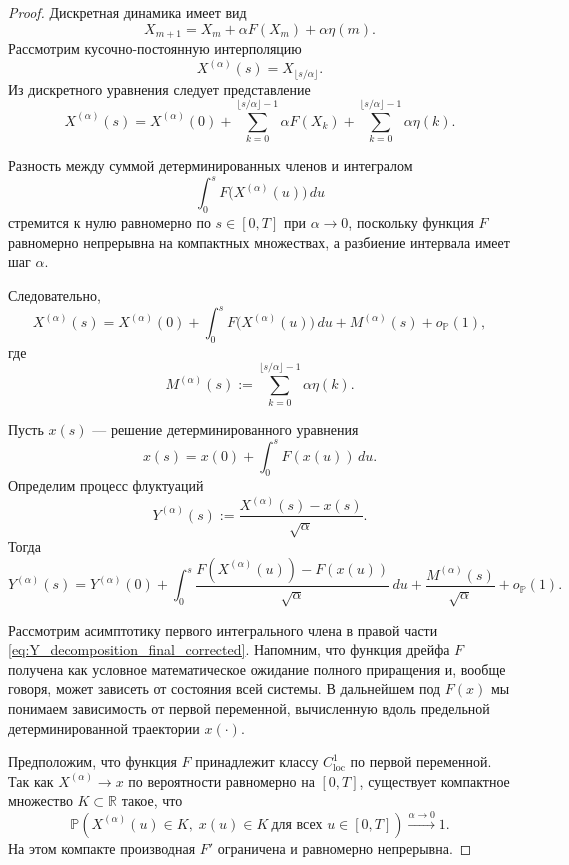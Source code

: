\documentclass[12pt,a4paper]{article}
\theoremstyle{definition}
\begin{document}
\begin{proof}
Дискретная динамика имеет вид
\[
X_{m+1}
=
X_m
+
\alpha F(X_m)
+
\alpha \eta(m).
\]
Рассмотрим кусочно-постоянную интерполяцию
\[
X^{(\alpha)}(s)
=
X_{\lfloor s/\alpha \rfloor}.
\]
Из дискретного уравнения следует представление
\begin{equation}
\label{eq:integral_representation_corrected}
X^{(\alpha)}(s)
=
X^{(\alpha)}(0)
+
\sum_{k=0}^{\lfloor s/\alpha \rfloor-1}
\alpha F(X_k)
+
\sum_{k=0}^{\lfloor s/\alpha \rfloor-1}
\alpha \eta(k).
\end{equation}

Разность между суммой детерминированных членов
и интегралом
\[
\int_0^s F\bigl(X^{(\alpha)}(u)\bigr)\,du
\]
стремится к нулю равномерно по $s\in[0,T]$
при $\alpha\to0$,
поскольку функция $F$ равномерно непрерывна
на компактных множествах,
а разбиение интервала имеет шаг $\alpha$.

Следовательно,
\[
X^{(\alpha)}(s)
=
X^{(\alpha)}(0)
+
\int_0^s F\bigl(X^{(\alpha)}(u)\bigr)\,du
+
M^{(\alpha)}(s)
+
o_{\mathbb P}(1),
\]
где
\[
M^{(\alpha)}(s)
:=
\sum_{k=0}^{\lfloor s/\alpha \rfloor-1}
\alpha \eta(k).
\]

Пусть $x(s)$ — решение детерминированного уравнения
\[
x(s)
=
x(0)
+
\int_0^s F(x(u))\,du.
\]
Определим процесс флуктуаций
\[
Y^{(\alpha)}(s)
:=
\frac{X^{(\alpha)}(s)-x(s)}{\sqrt{\alpha}}.
\]
Тогда
\begin{equation}
\label{eq:Y_decomposition_final_corrected}
Y^{(\alpha)}(s)
=
Y^{(\alpha)}(0)
+
\int_0^s
\frac{F(X^{(\alpha)}(u))-F(x(u))}{\sqrt{\alpha}}\,du
+
\frac{M^{(\alpha)}(s)}{\sqrt{\alpha}}
+
o_{\mathbb P}(1).
\end{equation}

Рассмотрим асимптотику первого интегрального члена
в правой части \eqref{eq:Y_decomposition_final_corrected}.
Напомним, что функция дрейфа $F$
получена как условное математическое ожидание полного приращения
и, вообще говоря, может зависеть от состояния всей системы.
В дальнейшем под $F(x)$ мы понимаем зависимость от первой переменной,
вычисленную вдоль предельной детерминированной траектории $x(\cdot)$.

Предположим, что функция $F$ принадлежит классу $C^1_{\mathrm{loc}}$
по первой переменной.
Так как $X^{(\alpha)} \to x$ по вероятности равномерно на $[0,T]$,
существует компактное множество $K \subset \mathbb R$ такое, что
\[
\mathbb P\!\left(
X^{(\alpha)}(u)\in K,\; x(u)\in K
\ \text{для всех } u\in[0,T]
\right)\xrightarrow{\alpha\to0}1.
\]
На этом компакте производная $F'$ ограничена и равномерно непрерывна.


\end{proof}
\end{document}
